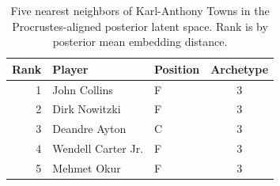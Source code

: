 \begin{table}[htbp]
  \centering\small
  \begin{tabular}{rllc}
    \toprule
    Rank & Player & Position & Archetype \\
    \midrule
    1 & John Collins & F & 3 \\
    2 & Dirk Nowitzki & F & 3 \\
    3 & Deandre Ayton & C & 3 \\
    4 & Wendell Carter Jr. & F & 3 \\
    5 & Mehmet Okur & F & 3 \\
    \bottomrule
  \end{tabular}
  \caption{Five nearest neighbors of Karl-Anthony Towns in the Procrustes-aligned posterior latent space. Rank is by posterior mean embedding distance.}
  \label{tab:Karl_Anthony_Towns_neighbors}
\end{table}

